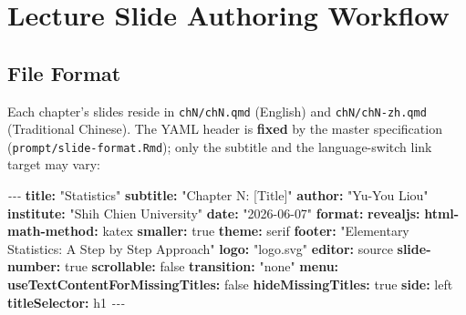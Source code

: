 \documentclass[
]{article}
\newenvironment{Shaded}{\begin{snugshade}}{\end{snugshade}}
\newcommand{\AttributeTok}[1]{\textcolor[rgb]{0.13,0.29,0.53}{#1}}
\newcommand{\CharTok}[1]{\textcolor[rgb]{0.31,0.60,0.02}{#1}}
\newcommand{\FunctionTok}[1]{\textcolor[rgb]{0.13,0.29,0.53}{\textbf{#1}}}
\newcommand{\KeywordTok}[1]{\textcolor[rgb]{0.13,0.29,0.53}{\textbf{#1}}}
\newcommand{\PreprocessorTok}[1]{\textcolor[rgb]{0.56,0.35,0.01}{\textit{#1}}}
\newcommand{\StringTok}[1]{\textcolor[rgb]{0.31,0.60,0.02}{#1}}
\newcounter{none} %
\begin{document}
\newpage

\section{Lecture Slide Authoring
Workflow}\label{lecture-slide-authoring-workflow}

\subsection{File Format}\label{file-format}

Each chapter's slides reside in \texttt{chN/chN.qmd} (English) and
\texttt{chN/chN-zh.qmd} (Traditional Chinese). The YAML header is
\textbf{fixed} by the master specification
(\texttt{prompt/slide-format.Rmd}); only the subtitle and the
language-switch link target may vary:

\begin{Shaded}
\begin{Highlighting}[]
\PreprocessorTok{{-}{-}{-}}
\FunctionTok{title}\KeywordTok{:}\AttributeTok{ }\StringTok{"Statistics"}
\FunctionTok{subtitle}\KeywordTok{:}\AttributeTok{ }\StringTok{"Chapter N: [Title]"}
\FunctionTok{author}\KeywordTok{:}\AttributeTok{ }\StringTok{"Yu{-}You Liou"}
\FunctionTok{institute}\KeywordTok{:}\AttributeTok{ }\StringTok{"Shih Chien University"}
\FunctionTok{date}\KeywordTok{:}\AttributeTok{ }\StringTok{"2026{-}06{-}07"}
\FunctionTok{format}\KeywordTok{:}
\AttributeTok{  }\FunctionTok{revealjs}\KeywordTok{:}
\AttributeTok{    }\FunctionTok{html{-}math{-}method}\KeywordTok{:}\AttributeTok{ katex}
\AttributeTok{    }\FunctionTok{smaller}\KeywordTok{:}\AttributeTok{ }\CharTok{true}
\AttributeTok{    }\FunctionTok{theme}\KeywordTok{:}\AttributeTok{ serif}
\AttributeTok{    }\FunctionTok{footer}\KeywordTok{:}\AttributeTok{ }\StringTok{"Elementary Statistics: A Step by Step Approach"}
\AttributeTok{    }\FunctionTok{logo}\KeywordTok{:}\AttributeTok{ }\StringTok{"logo.svg"}
\AttributeTok{    }\FunctionTok{editor}\KeywordTok{:}\AttributeTok{ source}
\AttributeTok{    }\FunctionTok{slide{-}number}\KeywordTok{:}\AttributeTok{ }\CharTok{true}
\AttributeTok{    }\FunctionTok{scrollable}\KeywordTok{:}\AttributeTok{ }\CharTok{false}
\AttributeTok{    }\FunctionTok{transition}\KeywordTok{:}\AttributeTok{ }\StringTok{"none"}
\AttributeTok{    }\FunctionTok{menu}\KeywordTok{:}
\AttributeTok{      }\FunctionTok{useTextContentForMissingTitles}\KeywordTok{:}\AttributeTok{ }\CharTok{false}
\AttributeTok{      }\FunctionTok{hideMissingTitles}\KeywordTok{:}\AttributeTok{ }\CharTok{true}
\AttributeTok{      }\FunctionTok{side}\KeywordTok{:}\AttributeTok{ }\StringTok{\textquotesingle{}left\textquotesingle{}}
\AttributeTok{      }\FunctionTok{titleSelector}\KeywordTok{:}\AttributeTok{ }\StringTok{\textquotesingle{}h1\textquotesingle{}}
\PreprocessorTok{{-}{-}{-}}
\end{Highlighting}
\end{Shaded}
\end{document}
